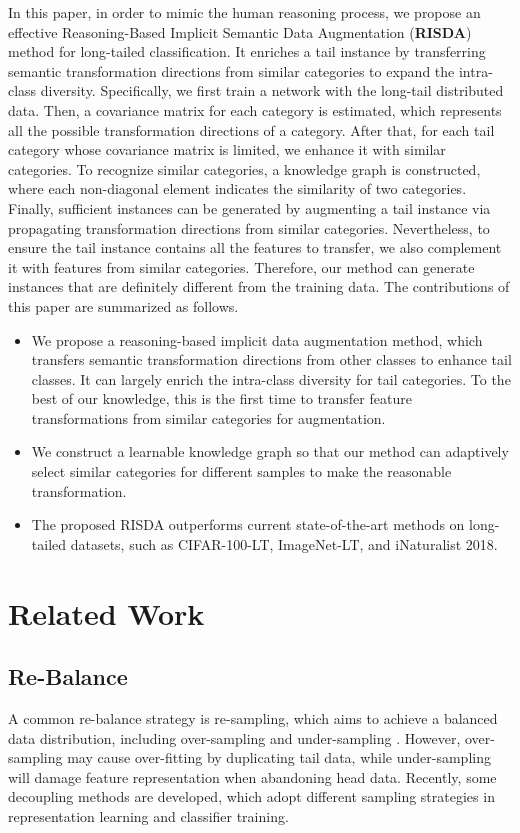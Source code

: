 \documentclass[letterpaper]{article} \usepackage{aaai22}  \usepackage{times}  \usepackage{helvet}  \usepackage{courier}  \usepackage[hyphens]{url}  \usepackage{graphicx} \usepackage{bm}
\begin{document}
	
	In this paper, in order to mimic the human reasoning process, we propose an effective Reasoning-Based Implicit Semantic Data Augmentation (\textbf{RISDA}) method for long-tailed classification. It enriches a tail instance by transferring semantic transformation directions from similar categories to expand the intra-class diversity. Specifically, we first train a network with the long-tail distributed data. Then, a covariance matrix for each category is estimated, which represents all the possible transformation directions of a category. After that, for each tail category whose covariance matrix is limited, we enhance it with similar categories. To recognize similar categories, a knowledge graph is constructed, where each non-diagonal element indicates the similarity of two categories. Finally, sufficient instances can be generated by augmenting a tail instance via propagating transformation directions from similar categories. Nevertheless, to ensure the tail instance contains all the features to transfer, we also complement it with features from similar categories. Therefore, our method can generate instances that are definitely different from the training data. 
The contributions of this paper are summarized as follows.
	\begin{itemize}
		\item We propose a reasoning-based implicit data augmentation method, which transfers semantic transformation directions from other classes to enhance tail classes. It can largely enrich the intra-class diversity for tail categories. To the best of our knowledge, this is the first time to transfer feature transformations from similar categories for augmentation. 
		\item We construct a learnable knowledge graph so that our method can adaptively select similar categories for different samples to make the reasonable transformation.
		\item The proposed RISDA outperforms current state-of-the-art methods on long-tailed datasets, such as CIFAR-100-LT, ImageNet-LT, and iNaturalist 2018.
	\end{itemize}


	
	\section{Related Work}
	\subsection{Re-Balance}
A common re-balance strategy is re-sampling, which aims to achieve a balanced data distribution, including over-sampling \cite{buda2018systematic,byrd2019effect} and under-sampling \cite{he2009learning,buda2018systematic}. However, over-sampling may cause over-fitting by duplicating tail data, while under-sampling will damage feature representation when abandoning head data. 
	Recently, some decoupling methods are developed, which adopt different sampling strategies in representation learning and classifier training\cite{kang2019decoupling,zhou2020bbn,wang2021contrastive}.
\end{document}
